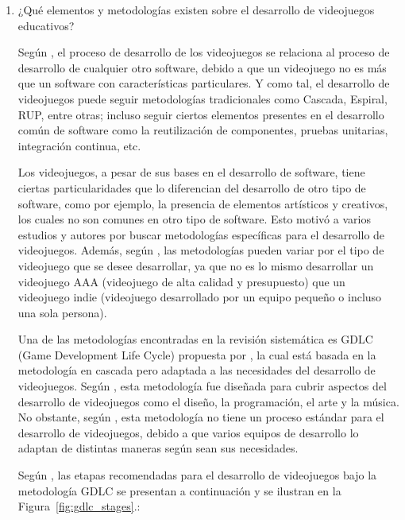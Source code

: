 \begin{enumerate}
    \item ¿Qué elementos y metodologías existen sobre el desarrollo de videojuegos educativos?
    
    Según \cite{}, el proceso de desarrollo de los videojuegos se relaciona al proceso de desarrollo de cualquier otro software, debido a que un videojuego no es más que un software con características particulares. Y como tal, el desarrollo de videojuegos puede seguir metodologías tradicionales como Cascada, Espiral, RUP, entre otras; incluso seguir ciertos elementos presentes en el desarrollo común de software como la reutilización de componentes, pruebas unitarias, integración continua, etc.
    
    Los videojuegos, a pesar de sus bases en el desarrollo de software, tiene ciertas particularidades que lo diferencian del desarrollo de otro tipo de software, como por ejemplo, la presencia de elementos artísticos y creativos, los cuales no son comunes en otro tipo de software. Esto motivó a varios estudios y autores por buscar metodologías específicas para el desarrollo de videojuegos. Además, según \cite{}, las metodologías pueden variar por el tipo de videojuego que se desee desarrollar, ya que no es lo mismo desarrollar un videojuego AAA (videojuego de alta calidad y presupuesto) que un videojuego indie (videojuego desarrollado por un equipo pequeño o incluso una sola persona).

    Una de las metodologías encontradas en la revisión sistemática es GDLC (Game Development Life Cycle) propuesta por \cite{}, la cual está basada en la metodología en cascada pero adaptada a las necesidades del desarrollo de videojuegos. Según \cite{}, esta metodología fue diseñada para cubrir aspectos del desarrollo de videojuegos como el diseño, la programación, el arte y la música. No obstante, según \cite{}, esta metodología no tiene un proceso estándar para el desarrollo de videojuegos, debido a que varios equipos de desarrollo lo adaptan de distintas maneras según sean sus necesidades.

    Según \cite{}, las etapas recomendadas para el desarrollo de videojuegos bajo la metodología GDLC se presentan a continuación y se ilustran en la Figura~\ref{fig:gdlc_stages}.:


\end{enumerate}
